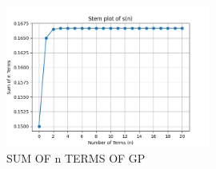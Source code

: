 \documentclass[journal,12pt,twocolumn]{IEEEtran}
\theoremstyle{remark}
\begin{document}
\begin{figure}[h]
  \centering
  \includegraphics[width=0.6\textwidth]{figs/graph.png}
  \caption{SUM OF n TERMS OF GP}
  \label{fig:your_label}
\end{figure}
\end{document}
